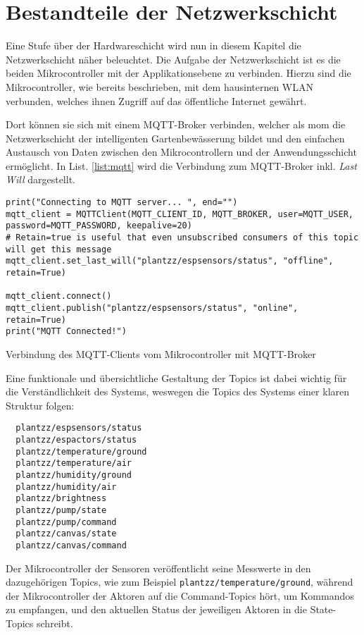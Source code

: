 
\section{Bestandteile der Netzwerkschicht}

Eine Stufe über der Hardwareschicht wird nun in diesem Kapitel die Netzwerkschicht näher beleuchtet.
Die Aufgabe der Netzwerkschicht ist es die beiden Mikrocontroller mit der Applikationsebene zu verbinden.
Hierzu sind die Mikrocontroller, wie bereits beschrieben, mit dem hausinternen WLAN verbunden, welches ihnen Zugriff auf das öffentliche Internet gewährt.

Dort können sie sich mit einem MQTT-Broker verbinden, welcher als \gls{mom} die Netzwerkschicht der intelligenten Gartenbewässerung bildet und den einfachen Austausch von Daten zwischen den Mikrocontrollern und der Anwendungsschicht ermöglicht. In List. \ref{list:mqtt} wird die Verbindung zum MQTT-Broker inkl. \textit{Last Will} dargestellt.

\begin{listing}[!ht]
\begin{verbatim}
print("Connecting to MQTT server... ", end="")
mqtt_client = MQTTClient(MQTT_CLIENT_ID, MQTT_BROKER, user=MQTT_USER, password=MQTT_PASSWORD, keepalive=20)
# Retain=true is useful that even unsubscribed consumers of this topic will get this message
mqtt_client.set_last_will("plantzz/espsensors/status", "offline", retain=True)

mqtt_client.connect()
mqtt_client.publish("plantzz/espsensors/status", "online", retain=True)
print("MQTT Connected!")
\end{verbatim}
\caption{Verbindung des MQTT-Clients vom Mikrocontroller mit MQTT-Broker}
\label{list:mqtt}
\end{listing}  

Eine funktionale und übersichtliche Gestaltung der Topics ist dabei wichtig für die Verständlichkeit des Systems, weswegen die Topics des Systems einer klaren Struktur folgen:

\begin{verbatim}
  plantzz/espsensors/status
  plantzz/espactors/status
  plantzz/temperature/ground
  plantzz/temperature/air
  plantzz/humidity/ground
  plantzz/humidity/air
  plantzz/brightness
  plantzz/pump/state
  plantzz/pump/command
  plantzz/canvas/state
  plantzz/canvas/command
\end{verbatim}

Der Mikrocontroller der Sensoren veröffentlicht seine Messwerte in den dazugehörigen Topics, wie zum Beispiel \texttt{plantzz/temperature/ground}, während der Mikrocontroller der Aktoren auf die Command-Topics hört, um Kommandos zu empfangen, und den aktuellen Status der jeweiligen Aktoren in die State-Topics schreibt.

